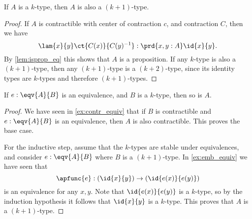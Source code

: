 
\begin{thm}
If $A$ is a $k$-type, then $A$ is also a $(k+1)$-type.
\end{thm}

\begin{proof}
If $A$ is contractible with center of contraction $c$, and contraction $C$, then we have
\begin{equation*}
\lam{x}{y} \ct{C(x)}{C(y)^{-1}} : \prd{x,y:A}\id{x}{y}.
\end{equation*}
By \autoref{lem:isprop_eq} this shows that $A$ is a proposition. If any $k$-type is also a $(k+1)$-type, then any $(k+1)$-type is a $(k+2)$-type, since its identity types are $k$-types and therefore $(k+1)$-types.
\end{proof}

\begin{thm}\label{thm:ntype_eqv}
If $e:\eqv{A}{B}$ is an equivalence, and $B$ is a $k$-type, then so is $A$.
\end{thm}

\begin{proof}
We have seen in \autoref{ex:contr_equiv} that if $B$ is contractible and $e:\eqv{A}{B}$ is an equivalence, then $A$ is also contractible. This proves the base case.

For the inductive step, assume that the $k$-types are stable under equivalences, and consider $e:\eqv{A}{B}$ where $B$ is a $(k+1)$-type. In \autoref{ex:emb_equiv} we have seen that
\begin{equation*}
\apfunc{e}:(\id{x}{y})\to(\id{e(x)}{e(y)})
\end{equation*}
is an equivalence for any $x,y$. Note that $\id{e(x)}{e(y)}$ is a $k$-type, so by the induction hypothesis it follows that $\id{x}{y}$ is a $k$-type. This proves that $A$ is a $(k+1)$-type.
\end{proof}

